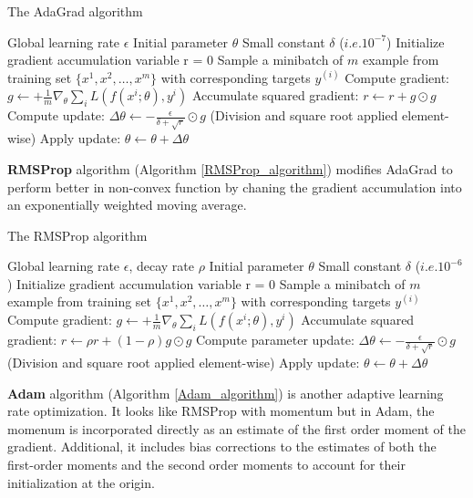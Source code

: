 \begin{algorithm}
	\caption{The AdaGrad algorithm}
	\label{AdaGrad_algorithm}
	\begin{algorithmic}
		\REQUIRE Global learning rate $\epsilon$
		\REQUIRE Initial parameter $\theta$
		\REQUIRE Small constant $\delta$ ($i.e. 10^{-7}$)
		\STATE Initialize gradient accumulation variable r = 0
			\STATE Sample a minibatch of $m$ example from training set $\{ x^1,x^2,\ldots, x^m \}$ with corresponding targets $y^{(i)}$
			\STATE Compute gradient: $g \leftarrow + \frac{1}{m} \nabla_{\theta} \sum_i L(f(x^i;\theta), y^i) $
			\STATE Accumulate squared gradient: $r \leftarrow r + g \odot g$
			\STATE Compute update: $\Delta \theta \leftarrow - \frac{\epsilon}{\delta + \sqrt{r}} \odot g$ (Division and square root applied element-wise)
			\STATE Apply update: $\theta \leftarrow \theta + \Delta \theta$
		\ENDWHILE
	\end{algorithmic}
\end{algorithm}

\textbf{RMSProp} algorithm \cite{} (Algorithm \ref{RMSProp_algorithm}) modifies AdaGrad to perform better in non-convex function by chaning the gradient accumulation into an exponentially weighted moving average. 

\begin{algorithm}
	\caption{The RMSProp algorithm}
	\label{RMSProp_algorithm}
	\begin{algorithmic}
		\REQUIRE Global learning rate $\epsilon$, decay rate $\rho$
		\REQUIRE Initial parameter $\theta$
		\REQUIRE Small constant $\delta$ ($i.e. 10^{-6}$)
		\STATE Initialize gradient accumulation variable r = 0
		\WHILE{stopping criterion not meet}
			\STATE Sample a minibatch of $m$ example from training set $\{ x^1,x^2,\ldots, x^m \}$ with corresponding targets $y^{(i)}$
			\STATE Compute gradient: $g \leftarrow + \frac{1}{m} \nabla_{\theta} \sum_i L(f(x^i;\theta), y^i) $
			\STATE Accumulate squared gradient: $r \leftarrow \rho r + (1 - \rho)g \odot g$
			\STATE Compute parameter update: $\Delta \theta \leftarrow - \frac{\epsilon}{\delta + \sqrt{r}} \odot g$ (Division and square root applied element-wise)
			\STATE Apply update: $\theta \leftarrow \theta + \Delta \theta$
		\ENDWHILE
	\end{algorithmic}
\end{algorithm}

\textbf{Adam} algorithm \cite{} (Algorithm \ref{Adam_algorithm}) is another adaptive learning rate optimization. It looks like RMSProp with momentum but in Adam, the momenum is incorporated directly as an estimate of the first order moment of the gradient. Additional, it includes bias corrections to the estimates of both the first-order moments and the second order moments to account for their initialization at the origin.

